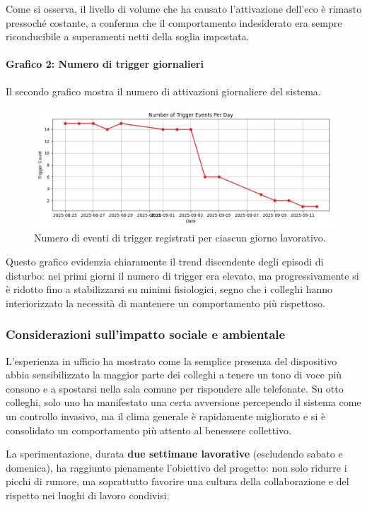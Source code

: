 \documentclass[fleqn,10pt]{SelfArx} %
\begin{document}
Come si osserva, il livello di volume che ha causato l'attivazione dell'eco è rimasto pressoché costante, a conferma che il comportamento indesiderato era sempre riconducibile a superamenti netti della soglia impostata.

\paragraph{Grafico 2: Numero di trigger giornalieri}

Il secondo grafico mostra il numero di attivazioni giornaliere del sistema.

\begin{figure}[h!]
	\centering
	\includegraphics[width=0.92\linewidth]{trigger_count_per_day.png}
	\caption{Numero di eventi di trigger registrati per ciascun giorno lavorativo.}
	\label{fig:trigger_count_day}
\end{figure}

Questo grafico evidenzia chiaramente il trend discendente degli episodi di disturbo: nei primi giorni il numero di trigger era elevato, ma progressivamente si è ridotto fino a stabilizzarsi su minimi fisiologici, segno che i colleghi hanno interiorizzato la necessità di mantenere un comportamento più rispettoso.

\subsubsection{Considerazioni sull'impatto sociale e ambientale}

L'esperienza in ufficio ha mostrato come la semplice presenza del dispositivo abbia sensibilizzato la maggior parte dei colleghi a tenere un tono di voce più consono e a spostarsi nella sala comune per rispondere alle telefonate. Su otto colleghi, solo uno ha manifestato una certa avversione percependo il sistema come un controllo invasivo, ma il clima generale è rapidamente migliorato e si è consolidato un comportamento più attento al benessere collettivo.

La sperimentazione, durata \textbf{due settimane lavorative} (escludendo sabato e domenica), ha raggiunto pienamente l'obiettivo del progetto: non solo ridurre i picchi di rumore, ma soprattutto favorire una cultura della collaborazione e del rispetto nei luoghi di lavoro condivisi.
\end{document}
